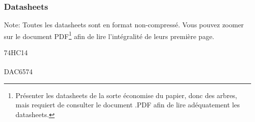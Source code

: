 \documentclass[10pt,a4paper,final]{article}
\begin{document}
\begin{spacing}{1.5}
\subsubsection{Datasheets}
Note: Toutes les datasheets sont en format non-compressé. Vous pouvez zoomer sur le document PDF\footnote{Présenter les datasheets de la sorte économise du papier, donc des arbres, mais requiert de consulter le document .PDF afin de lire adéquatement les datasheets.} afin de lire l'intégralité de leurs première page.
\begin{multicols}{3}
74HC14\\
\\
DAC6574\\

\end{multicols}
\end{spacing}
\end{document}
